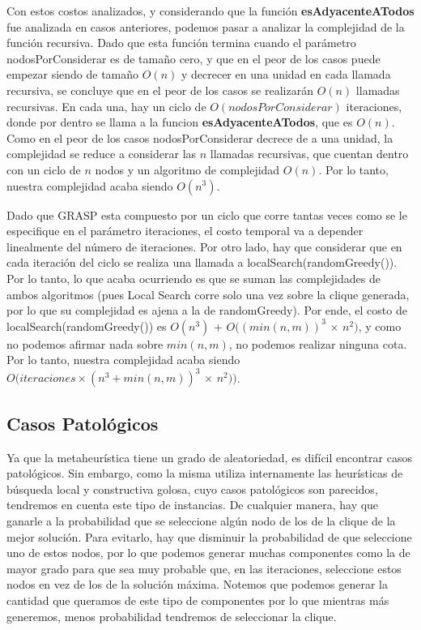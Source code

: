 Con estos costos analizados, y considerando que la función \textbf{esAdyacenteATodos} fue analizada en casos anteriores, podemos pasar a analizar la complejidad de la función recursiva. Dado que esta función termina cuando el parámetro nodosPorConsiderar es de tamaño cero, y que en el peor de los casos puede empezar siendo de tamaño $O(n)$ y decrecer en una unidad en cada llamada recursiva, se concluye que en el peor de los casos se realizarán $O(n)$ llamadas recursivas. En cada una, hay un ciclo de $O(nodosPorConsiderar)$ iteraciones, donde por dentro se llama a la funcion \textbf{esAdyacenteATodos}, que es $O(n)$. Como en el peor de los casos nodosPorConsiderar decrece de a una unidad, la complejidad se reduce a considerar las $n$ llamadas recursivas, que cuentan dentro con un ciclo de $n$ nodos y un algoritmo de complejidad $O(n)$. Por lo tanto, nuestra complejidad acaba siendo $O(n^3)$.

Dado que GRASP esta compuesto por un ciclo que corre tantas veces como se le especifique en el parámetro iteraciones, el costo temporal va a depender linealmente del número de iteraciones. Por otro lado, hay que considerar que en cada iteración del ciclo se realiza una llamada a localSearch(randomGreedy()). Por lo tanto, lo que acaba ocurriendo es que se suman las complejidades de ambos algoritmos (pues Local Search corre solo una vez sobre la clique generada, por lo que su complejidad es ajena a la de randomGreedy). Por ende, el costo de localSearch(randomGreedy()) es $O(n^3)$ + $O((min(n,m))^3$ $\times$ $n^2)$, y como no podemos afirmar nada sobre $min(n,m)$, no podemos realizar ninguna cota. Por lo tanto, nuestra complejidad acaba siendo $O(iteraciones \times (n^3 + min(n,m))^3$ $\times$ $n^2))$.

\subsection{Casos Patológicos}

Ya que la metaheurística tiene un grado de aleatoriedad, es difícil encontrar casos patológicos. Sin embargo, como la misma utiliza internamente las heurísticas de búsqueda local y constructiva golosa, cuyo casos patológicos son parecidos, tendremos en cuenta este tipo de instancias. De cualquier manera, hay que ganarle a la probabilidad que se seleccione algún nodo de los de la clique de la mejor solución. Para evitarlo, hay que disminuir la probabilidad de que seleccione uno de estos nodos, por lo que podemos generar muchas componentes como la de mayor grado para que sea muy probable que, en las iteraciones, seleccione estos nodos en vez de los de la solución máxima. Notemos que podemos generar la cantidad que queramos de este tipo de componentes por lo que mientras más generemos, menos probabilidad tendremos de seleccionar la clique.

